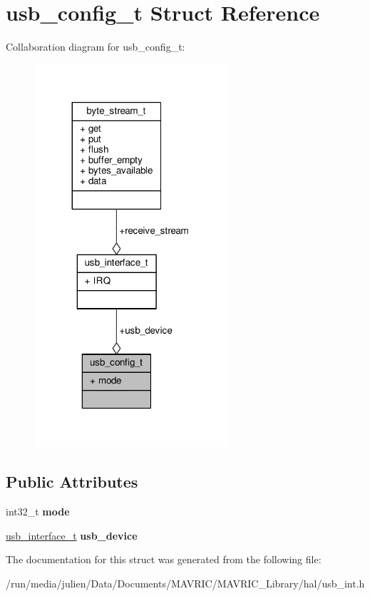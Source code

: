\hypertarget{structusb__config__t}{\section{usb\+\_\+config\+\_\+t Struct Reference}
\label{structusb__config__t}
}


Collaboration diagram for usb\+\_\+config\+\_\+t\+:
\nopagebreak
\begin{figure}[H]
\begin{center}
\leavevmode
\includegraphics[width=203pt]{structusb__config__t__coll__graph}
\end{center}
\end{figure}
\subsection*{Public Attributes}
\begin{DoxyCompactItemize}
\item 
\hypertarget{structusb__config__t_a3d2821717282459b1da8234195a169b2}{int32\+\_\+t {\bfseries mode}}\label{structusb__config__t_a3d2821717282459b1da8234195a169b2}

\item 
\hypertarget{structusb__config__t_aeb5e70827fe0e3fc05d1c4dcab93df79}{\hyperlink{structusb__interface__t}{usb\+\_\+interface\+\_\+t} {\bfseries usb\+\_\+device}}\label{structusb__config__t_aeb5e70827fe0e3fc05d1c4dcab93df79}

\end{DoxyCompactItemize}


The documentation for this struct was generated from the following file\+:\begin{DoxyCompactItemize}
\item 
/run/media/julien/\+Data/\+Documents/\+M\+A\+V\+R\+I\+C/\+M\+A\+V\+R\+I\+C\+\_\+\+Library/hal/usb\+\_\+int.\+h\end{DoxyCompactItemize}
